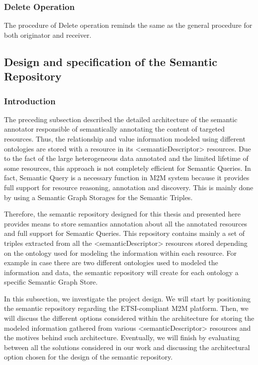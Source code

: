 \subsubsection*{Delete Operation}
The procedure of Delete operation reminds the same as the general procedure for both originator and receiver.


\subsection{Design and specification of the Semantic Repository}
\subsubsection{Introduction}
The preceding subsection described the detailed architecture of the semantic annotator responsible of semantically annotating the content of targeted resources. Thus, the relationship and value information modeled using different ontologies are stored with a resource in its <semanticDescriptor> resources. Due to the fact of the large heterogeneous data annotated and the limited lifetime of some resources, this approach is not completely efficient for Semantic Queries. In fact, Semantic Query is a necessary function in M2M system because it provides full support for resource reasoning, annotation and discovery. This is mainly done by using a Semantic Graph Storages for the Semantic Triples.\par
Therefore, the semantic repository designed for this thesis and presented here provides means to store semantics annotation about all the annotated resources and full support for Semantic Queries. This repository contains mainly a set of triples extracted from all the <semanticDescriptor> resources stored depending on the ontology used for modeling the information within each resource. For example in case there are two different ontologies used to modeled the information and data, the semantic repository will create for each ontology a specific Semantic Graph Store. \par
In this subsection, we investigate the project design. We will start by positioning the semantic repository regarding the ETSI-compliant M2M platform. Then, we will discuss the different options considered within the architecture for storing the modeled information gathered from various <semanticDescriptor> resources and the motives behind such architecture. Eventually, we will finish by evaluating between all the solutions considered in our work and discussing the architectural option chosen for the design of the semantic repository.
